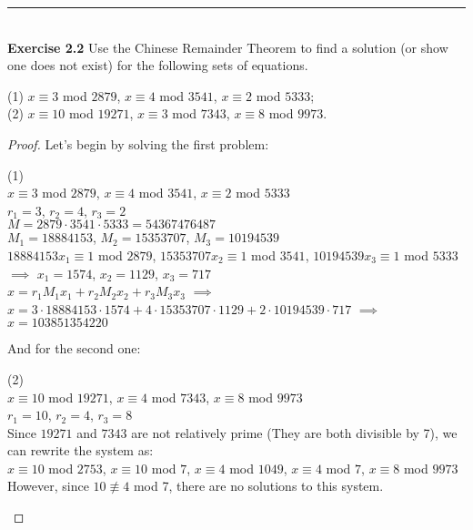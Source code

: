 \documentclass[a4paper]{article}
\begin{document}
\noindent\rule{12cm}{0.4pt}\\
\noindent \textbf{Exercise 2.2} Use the Chinese Remainder Theorem to find a solution (or show one does not exist) for the following sets of equations.
\begin{center}
(1) $x \equiv 3$ mod $2879$, $x \equiv 4$ mod $3541$, $x \equiv 2$ mod $5333$;\\
(2) $x \equiv 10$ mod $19271$, $x \equiv 3$ mod $7343$, $x \equiv 8$ mod $9973$.
\end {center}
\begin{proof}
Let's begin by solving the first problem:
\begin{center}
(1)\\
$x \equiv 3$ mod $2879$, $x \equiv 4$ mod $3541$, $x \equiv 2$ mod $5333$\\
$r_1 = 3$, $r_2 = 4$, $r_3 = 2$\\
$M = 2879 \cdot 3541 \cdot 5333=54367476487$\\
$M_1 = 18884153$, $M_2 = 15353707$, $M_3 = 10194539$\\
$18884153x_1 \equiv 1$ mod $2879$, $15353707x_2 \equiv 1$ mod $3541$, $10194539x_3 \equiv 1$ mod $5333$ $\implies$ $x_1 = 1574$, $x_2 = 1129$, $x_3 = 717$\\
$x = r_{1}M_{1}x_{1} + r_{2}M_{2}x_{2} + r_{3}M_{3}x_{3}$ $\implies$\\
$x = 3 \cdot 18884153 \cdot 1574 + 4 \cdot 15353707 \cdot 1129 + 2 \cdot 10194539 \cdot 717$ $\implies$\\
$x = 103851354220$
\end{center}
And for the second one:
\begin{center}
(2)\\
$x \equiv 10$ mod $19271$, $x \equiv 4$ mod $7343$, $x \equiv 8$ mod $9973$\\
$r_1 = 10$, $r_2 = 4$, $r_3 = 8$\\
Since $19271$ and $7343$ are not relatively prime (They are both divisible by 7), we can rewrite the system as: \\
$x \equiv 10$ mod $2753$, $x \equiv 10$ mod $7$, $x \equiv 4$ mod $1049$, $x \equiv 4$ mod $7$, $x \equiv 8$ mod $9973$\\
However, since $10 \not \equiv 4$ mod 7, there are no solutions to this system.
\end{center}
\end{proof}
\end{document}

